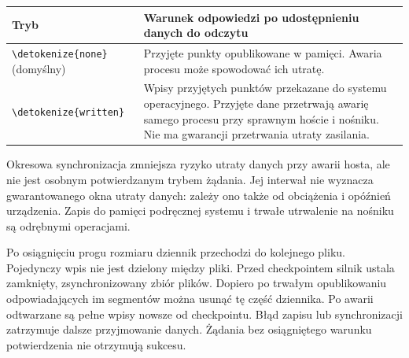 \documentclass[11pt,a4paper]{article}
\newcommand{\code}[1]{\expandafter\nolinkurl\expandafter{\detokenize{#1}}}
\begin{document}
\begin{tabularx}{\linewidth}{P{27mm}Y}
  \toprule
  Tryb                   & Warunek odpowiedzi po udostępnieniu danych do odczytu        \\ \midrule
  \code{none} (domyślny) & Przyjęte punkty opublikowane w pamięci. Awaria procesu
  może spowodować ich utratę.                                                           \\
  \code{written}         & Wpisy przyjętych punktów przekazane do systemu operacyjnego.
  Przyjęte dane przetrwają awarię samego procesu przy sprawnym hoście i nośniku.
  Nie ma gwarancji przetrwania utraty zasilania.                                        \\
  \bottomrule
\end{tabularx}

Okresowa synchronizacja zmniejsza ryzyko utraty danych przy awarii hosta,
ale nie jest osobnym potwierdzanym trybem żądania. Jej interwał nie
wyznacza gwarantowanego okna utraty danych: zależy ono także od obciążenia
i opóźnień urządzenia. Zapis do pamięci podręcznej systemu i trwałe
utrwalenie na nośniku są odrębnymi operacjami.

Po osiągnięciu progu rozmiaru dziennik przechodzi do kolejnego pliku.
Pojedynczy wpis nie jest dzielony między pliki. Przed checkpointem silnik
ustala zamknięty, zsynchronizowany zbiór plików. Dopiero po trwałym
opublikowaniu odpowiadających im segmentów można usunąć tę część dziennika.
Po awarii odtwarzane są pełne wpisy nowsze od checkpointu.
Błąd zapisu lub synchronizacji zatrzymuje dalsze przyjmowanie danych.
Żądania bez osiągniętego warunku potwierdzenia nie otrzymują sukcesu.
\end{document}
